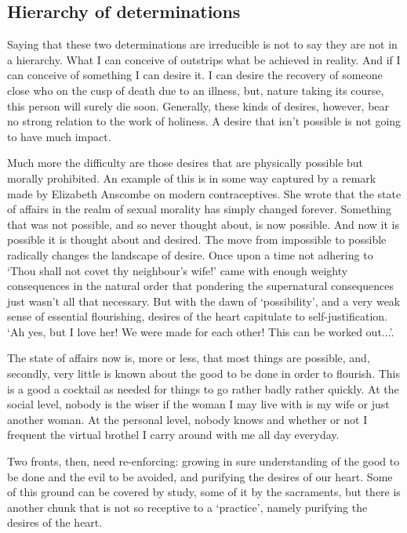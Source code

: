 \documentclass[12pt]{article}
\begin{document}
\subsection*{Hierarchy of determinations}

Saying that these two determinations are irreducible is not to say they are not in a hierarchy. What I can conceive of outstrips what be achieved in reality. And if I can conceive of something I can desire it. I can desire the recovery of someone close who on the cusp of death due to an illness, but, nature taking its course, this person will surely die soon. Generally, these kinds of desires, however, bear no strong relation to the work of holiness. A desire that isn't possible is not going to have much impact.

Much more the difficulty are those desires that are physically possible but morally prohibited. An example of this is in some way captured by a remark made by Elizabeth Anscombe on modern contraceptives. She wrote that the state of affairs in the realm of sexual morality has simply changed forever. Something that was not possible, and so never thought about, is now possible. And now it is possible it is thought about and desired. The move from impossible to possible radically changes the landscape of desire. Once upon a time not adhering to `Thou shall not covet thy neighbour's wife!' came with enough weighty consequences in the natural order that pondering the supernatural consequences just wasn't all that necessary. But with the dawn of `possibility', and a very weak sense of essential flourishing, desires of the heart capitulate to self-justification. `Ah yes, but I love her! We were made for each other! This can be worked out...'.

The state of affairs now is, more or less, that most things are possible, and, secondly, very little is known about the good to be done in order to flourish. This is a good a cocktail as needed for things to go rather badly rather quickly. At the social level, nobody is the wiser if the woman I may live with is my wife or just another woman. At the personal level, nobody knows and whether or not I frequent the virtual brothel I carry around with me all day everyday.

Two fronts, then, need re-enforcing: growing in sure understanding of the good to be done and the evil to be avoided, and purifying the desires of our heart. Some of this ground can be covered by study, some of it by the sacraments, but there is another chunk that is not so receptive to a `practice', namely purifying the desires of the heart.
\end{document}
